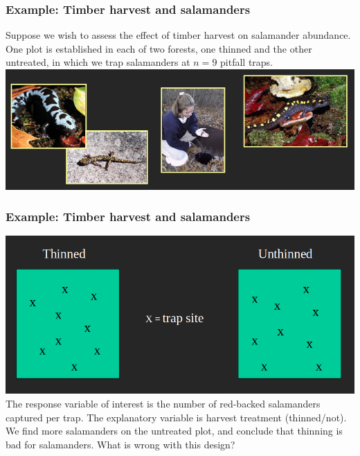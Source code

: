 \documentclass[color=usenames,dvipsnames]{beamer}\usepackage[]{graphicx}\usepackage[]{color}
\begin{document}
\begin{frame}
  \frametitle{Example: Timber harvest and salamanders}
  Suppose we wish to assess the effect of timber harvest on salamander
  abundance.  One plot is established in each of two forests, one
  thinned and the other untreated, in which we trap salamanders at $n=9$
  pitfall traps.  %
  \vfill
  \centering
  \includegraphics[width=\textwidth]{salamanders} \\
\end{frame}


\begin{frame}
  \frametitle{Example: Timber harvest and salamanders}
  \includegraphics[width=\textwidth]{salamander-design} \\
  \vfill
  The response variable of interest is the number of red-backed
  salamanders captured per trap.  The explanatory variable is harvest
  treatment (thinned/not). We find more salamanders on the untreated
  plot, and conclude that thinning is bad for salamanders.  What is
  wrong with this design?  
\end{frame}
\end{document}

